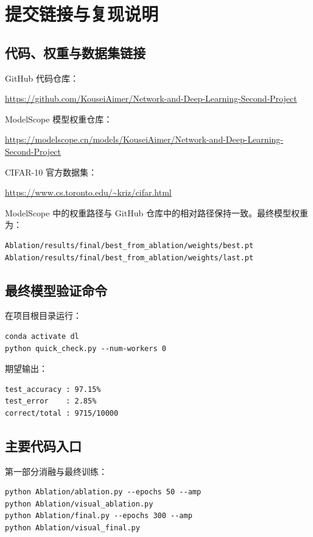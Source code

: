 \documentclass[UTF8,a4paper,11pt]{ctexart}
\begin{document}
\appendix
\section{提交链接与复现说明}

\subsection{代码、权重与数据集链接}

GitHub 代码仓库：
\begin{center}
\url{https://github.com/KouseiAimer/Network-and-Deep-Learning-Second-Project}
\end{center}

ModelScope 模型权重仓库：
\begin{center}
\url{https://modelscope.cn/models/KouseiAimer/Network-and-Deep-Learning-Second-Project}
\end{center}

CIFAR-10 官方数据集：
\begin{center}
\url{https://www.cs.toronto.edu/~kriz/cifar.html}
\end{center}

ModelScope 中的权重路径与 GitHub 仓库中的相对路径保持一致。最终模型权重为：
\begin{verbatim}
Ablation/results/final/best_from_ablation/weights/best.pt
Ablation/results/final/best_from_ablation/weights/last.pt
\end{verbatim}

\subsection{最终模型验证命令}

在项目根目录运行：
\begin{verbatim}
conda activate dl
python quick_check.py --num-workers 0
\end{verbatim}

期望输出：
\begin{verbatim}
test_accuracy : 97.15%
test_error    : 2.85%
correct/total : 9715/10000
\end{verbatim}

\subsection{主要代码入口}

第一部分消融与最终训练：
\begin{verbatim}
python Ablation/ablation.py --epochs 50 --amp
python Ablation/visual_ablation.py
python Ablation/final.py --epochs 300 --amp
python Ablation/visual_final.py
\end{verbatim}
\end{document}
